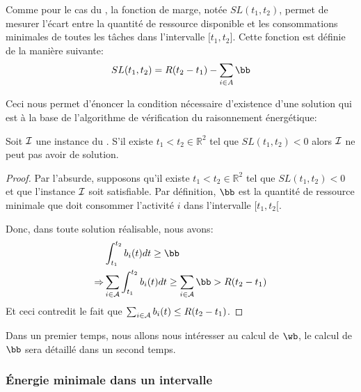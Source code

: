Comme pour le cas du \CUSP, la fonction de marge, notée $SL(t_1,t_2)$,
permet de mesurer l'écart entre la quantité de ressource disponible et
les consommations minimales de toutes les tâches dans l'intervalle
${[}t_1,t_2{]}$. Cette fonction est définie de la manière suivante:
\[ SL(t_1,t_2)=R(t_2-t_1)-\sum\limits_{i \in A} \bb \]

Ceci nous permet d'énoncer la condition nécessaire d'existence
d'une solution qui est à la base de l'algorithme de vérification du
raisonnement énergétique:

\begin{theo}
  \label{th:ER_CECSP}
  Soit ${\cal I}$ une instance du \CECSP. S'il existe $t_1 < t_2 \in
  \mathbb{R}^2$ tel que $SL(t_1,t_2) <0$ alors ${\cal I}$ ne peut pas avoir
  de solution.
\end{theo}

\begin{proof}
  Par l'absurde, supposons qu'il existe $t_1 < t_2 \in \mathbb{R}^2$ tel
  que $SL(t_1,t_2) <0$ et que l'instance ${\cal I}$ soit satisfiable. Par
  définition, $\bb$ est la quantité de ressource minimale que doit
  consommer l'activité $i$ dans l'intervalle $[t_1,t_2{[}$. 

  Donc, dans toute solution réalisable, nous avons: 
  \begin{align*}
    & \int_{t_1}^{t_2} b_i(t)dt \ge \bb\\
    \Rightarrow  & \sum_{i \in \A} \int_{t_1}^{t_2} b_i(t)dt \ge \sum_{i
                   \in \A}  \bb > R(t_2-t_1)
  \end{align*}
  Et ceci contredit le fait que $\sum_{i \in {\cal A}} b_i(t) \le
  R(t_2-t_1)$. 
\end{proof}

Dans un premier temps, nous allons nous intéresser au calcul de $\wb$,
le calcul de $\bb$ sera détaillé dans un second temps. 


\subsubsection{{\'E}nergie minimale dans un intervalle}

